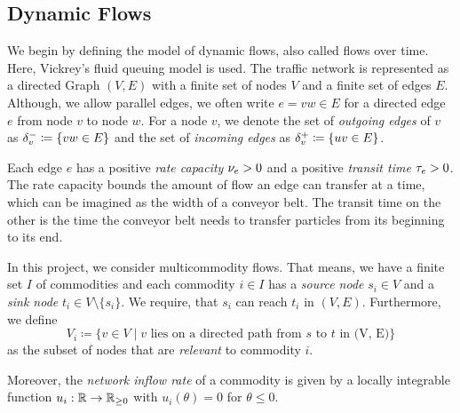 \subsection{Dynamic Flows}\label{subsec:dynamic-flows}

We begin by defining the model of dynamic flows, also called flows over time.
Here, Vickrey's fluid queuing model is used.
The traffic network is represented as a directed Graph $(V, E)$ with a finite set of nodes $V$ and a finite set of edges $E$.
Although, we allow parallel edges, we often write $e=vw\in E$ for a directed edge $e$ from node $v$ to node $w$.
For a node $v$, we denote the set of \emph{outgoing edges} of $v$ as $\delta^-_{v}\coloneqq \{ vw \in E \}$ and the set of \emph{incoming edges} as $\delta^+_{v} \coloneqq \{ uv \in E \}$.

Each edge $e$ has a positive \emph{rate capacity} $\nu_e > 0$ and a positive \emph{transit time} $\tau_e > 0$.
The rate capacity bounds the amount of flow an edge can transfer at a time, which can be imagined as the width of a conveyor belt.
The transit time on the other is the time the conveyor belt needs to transfer particles from its beginning to its end.

In this project, we consider multicommodity flows.
That means, we have a finite set $I$ of commodities and each commodity $i\in I$ has a \emph{source node} $s_i\in V$ and a \emph{sink node} $t_i\in V\setminus\{ s_i \}$.
We require, that $s_i$ can reach $t_i$ in $(V,E)$.
Furthermore, we define \[
    V_i \coloneqq \{ v \in V \mid \text{$v$ lies on a directed path from $s$ to $t$ in (V, E)} \}
\]
as the subset of nodes that are \emph{relevant} to commodity $i$.

Moreover, the \emph{network inflow rate} of a commodity is given by a locally integrable function $u_i:\mathbb{R} \rightarrow \mathbb{R}_{\geq 0}$ with $u_i(\theta) = 0$ for $\theta \leq 0$.

